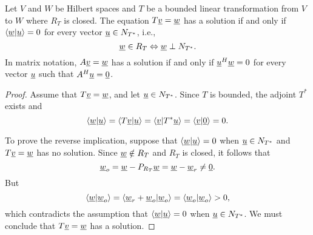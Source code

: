 \begin{theorem}
Let $V$ and $W$ be Hilbert spaces and $T$ be a bounded linear transformation from $V$ to $W$ where $R_T$ is closed.
The equation $T\underline{v} = \underline{w}$ has a solution if and only if $\left\langle \underline{w} | \underline{u} \right\rangle = 0$ for every vector $\underline{u} \in N_{T^*}$, i.e.,
\begin{equation*}
\underline{w} \in R_T \Leftrightarrow \underline{w} \perp N_{T^*} .
\end{equation*}
In matrix notation, $A \underline{v} = \underline{w}$ has a solution if and only if $\underline{u}^H \underline{w} = 0$ for every vector $\underline{u}$ such that $A^H \underline{u} = \underline{0}$.
\end{theorem}
\begin{proof}
Assume that $T \underline{v} = \underline{w}$, and let $\underline{u} \in N_{T^*}$.
Since $T$ is bounded, the adjoint $T^*$ exists and
\begin{equation*}
\left\langle \underline{w} | \underline{u} \right\rangle
= \left\langle T \underline{v} | \underline{u} \right\rangle
= \left\langle \underline{v} | T^* \underline{u} \right\rangle
= \left\langle \underline{v} | \underline{0} \right\rangle
= 0 .
\end{equation*}

To prove the reverse implication, suppose that $\left\langle \underline{w} | \underline{u} \right\rangle = 0$ when $\underline{u} \in N_{T^*}$ and $T \underline{v} = \underline{w}$ has no solution.
Since $\underline{w} \notin R_T$ and $R_T$ is closed, it follows that
\begin{equation*}
\underline{w}_o = \underline{w} - P_{R_T} \underline{w} = \underline{w} - \underline{w}_r
\neq \underline{0}.
\end{equation*}
But
\begin{equation*}
\left\langle \underline{w} | \underline{w}_o \right\rangle
= \left\langle \underline{w}_r + \underline{w}_o  | \underline{w}_o \right\rangle
= \left\langle \underline{w}_o | \underline{w}_o \right\rangle
> 0,
\end{equation*}
which contradicts the assumption that $\left\langle \underline{w} | \underline{u} \right\rangle = 0$ when $\underline{u} \in N_{T^*}$.
We must conclude that $T \underline{v} = \underline{w}$ has a solution.
\end{proof}


